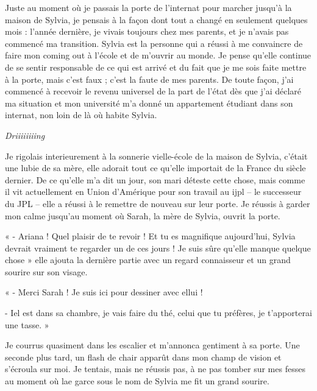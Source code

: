 \documentclass[12pt,hidelinks,a4paper]{book}
\begin{document}
\bigskip

Juste au moment où je passais la porte de l'internat pour marcher
jusqu'à la maison de Sylvia, je pensais à la façon dont tout a changé
en seulement quelques mois : l'année dernière, je vivais toujours
chez mes parents, et je n'avais pas commencé ma transition. Sylvia
est la personne qui a réussi à me convaincre de faire mon coming out
à l'école et de m'ouvrir au monde. Je pense qu'elle continue de se
sentir responsable de ce qui est arrivé et du fait que je me sois
faite mettre à la porte, mais c'est faux ; c'est la faute de mes parents.
De toute façon, j'ai commencé à recevoir le revenu universel de la
part de l'état dès que j'ai déclaré ma situation et mon université
m'a donné un appartement étudiant dans son internat, non loin de là
où habite Sylvia.\par

\bigskip

\textit{Driiiiiiiing}\par

Je rigolais interieurement à la sonnerie vielle-école de la maison
de Sylvia, c'était une lubie de sa mère, elle adorait tout ce qu'elle
importait de la France du siècle dernier. De ce qu'elle m'a dit un
jour, son mari déteste cette chose, mais comme il vit actuellement
en Union d'Amérique pour son travail au \gls{ijpl} -- le successeur
du JPL -- elle a réussi à le remettre de nouveau sur leur porte.
Je réussis à garder mon calme jusqu'au moment où Sarah, la mère de
Sylvia, ouvrit la porte.\par

\bigskip

« - Ariana ! Quel plaisir de te revoir ! Et tu es magnifique aujourd'hui,
Sylvia devrait vraiment te regarder un de ces jours ! Je suis sûre
qu'elle manque quelque chose » elle ajouta la dernière partie avec
un regard connaisseur et un grand sourire sur son visage.

« - Merci Sarah ! Je suis ici pour dessiner avec ellui !

- Iel est dans sa chambre, je vais faire du thé, celui que tu préfères,
je t'apporterai une tasse. »

\bigskip

Je courrus quasiment dans les escalier et m'annonca gentiment à sa
porte. Une seconde plus tard, un flash de chair apparût dans mon champ
de vision et s'écroula sur moi. Je tentais, mais ne réussis pas, à
ne pas tomber sur mes fesses au moment où lae garce sous le nom de
Sylvia me fit un grand sourire.\par
\end{document}

